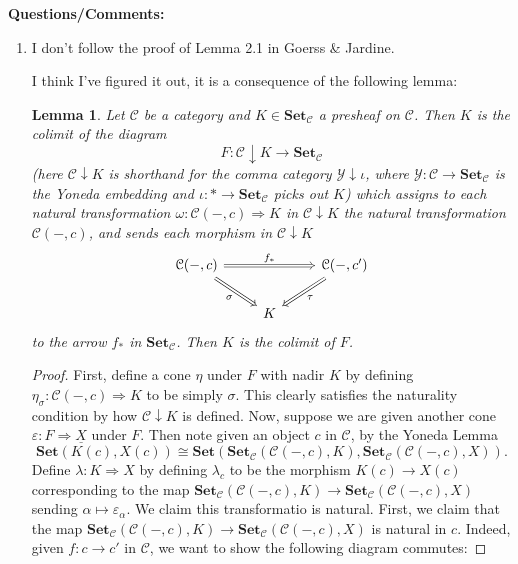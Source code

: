 \documentclass{amsart}
\theoremstyle{plain}
\newtheorem{lemma}[theorem]{Lemma}
\theoremstyle{definition}
\newcommand{\Set}{\mbf{Set}}
\newcommand{\0}{\mathbf{0}}
\newcommand{\cC}{\mathcal C}
\newcommand{\cY}{\mathcal Y}
\newcommand{\mbf}[1]{\mathbf{#1}}
\newcommand{\vare}{\varepsilon}
\renewcommand{\(}{\left(}
\renewcommand{\)}{\right)}
\begin{document}
\textbf{Questions/Comments:}\begin{enumerate}
  \item I don't follow the proof of Lemma 2.1 in Goerss \& Jardine.
  
  I think I've figured it out, it is a consequence of the following lemma:
  \begin{lemma}
    Let $\cC$ be a category and $K\in\Set_\cC$ a presheaf on $\cC$. Then $K$ is the colimit of the diagram
    \[F:\cC\downarrow  K\to\Set_\cC\]
    (here $\cC\downarrow K$ is shorthand for the comma category $\cY\downarrow\iota$, where $\cY:\cC\to\Set_\cC$ is the Yoneda embedding and $\iota:\ast\to\Set_\cC$ picks out $K$)
    which assigns to each natural transformation $\omega:\cC(-,c)\Rightarrow K$ in $\cC\downarrow K$ the natural transformation $\cC(-,c)$, and sends each morphism in $\cC\downarrow K$
    \[\begin{tikzcd}
      {\cC(-,c)} && {\cC(-,c')} \\
      & K
      \arrow["{f_\ast}", Rightarrow, from=1-1, to=1-3]
      \arrow["\tau", Rightarrow, from=1-3, to=2-2]
      \arrow["\sigma"', Rightarrow, from=1-1, to=2-2]
    \end{tikzcd}\]
    to the arrow $f_\ast$ in $\Set_\cC$. Then $K$ is the colimit of $F$.
  \end{lemma}
  \begin{proof}
    First, define a cone $\eta$ under $F$ with nadir $K$ by defining $\eta_\sigma:\cC(-,c)\Rightarrow K$ to be simply $\sigma$. This clearly satisfies the naturality condition by how $\cC\downarrow K$ is defined. Now, suppose we are given another cone $\vare:F\Rightarrow\underline{X}$ under $F$. Then note given an object $c$ in $\cC$, by the Yoneda Lemma
    \[\Set(K(c),X(c))\cong\Set(\Set_\cC(\cC(-,c),K),\Set_\cC(\cC(-,c),X)).\]
    Define $\lambda:K\Rightarrow X$ by defining $\lambda_c$ to be the morphism $K(c)\to X(c)$ corresponding to the map $\Set_\cC(\cC(-,c),K)\to\Set_\cC(\cC(-,c),X)$ sending $\alpha\mapsto\vare_\alpha$. We claim this transformatio is natural. First, we claim that the map $\Set_\cC(\cC(-,c),K)\to\Set_\cC(\cC(-,c),X)$ is natural in $c$. Indeed, given $f:c\to c'$ in $\cC$, we want to show the following diagram commutes:

\end{proof}
\end{enumerate}
\end{document}
